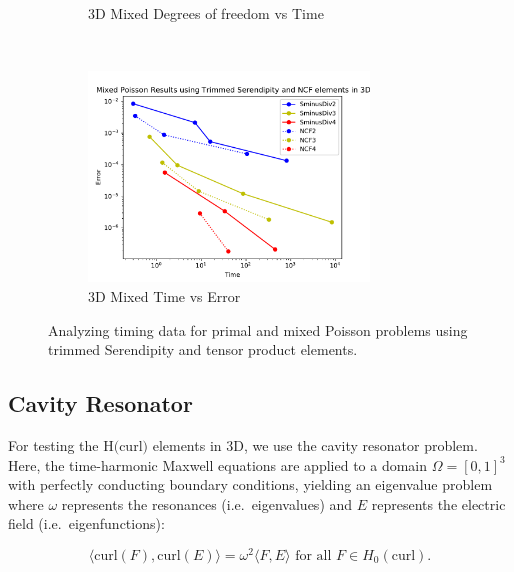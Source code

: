 \documentclass[manuscript,screen]{acmart}
\newcommand{\R}{\mathbb{R}}
\newcommand{\akg}[1]{\textcolor{blue}{\textbf{AG:} #1}}
\begin{document}
\begin{figure}[ht]
\begin{subfigure}[h]{0.5\textwidth}
    \caption{3D Mixed Degrees of freedom vs Time}
    \label{fig:3dMixedDofsTime}
  \end{subfigure}
  ~
  \begin{subfigure}[h]{0.5\textwidth}
    \centering
    \includegraphics[height=2.2in]{3dMixedPoissonTimeError.pdf}
    \caption{3D Mixed Time vs Error}
    \label{fig:3dMixedTimeError}
  \end{subfigure}
  \caption{Analyzing timing data for primal and mixed Poisson problems using trimmed Serendipity and tensor product elements.}
\label{fig:PrimalMixedTimeAnalysis}
\end{figure}


\newpage  
  
\newpage 



\subsection{Cavity Resonator}

For testing the H$($curl$)$ elements in 3D, we use the cavity resonator problem.  Here, the time-harmonic Maxwell equations are applied to a domain $\Omega = [0,1]^3$ with perfectly conducting boundary conditions, yielding an eigenvalue problem where $\omega$ represents the resonances (i.e.\ eigenvalues) and $E$ represents the electric field (i.e.\ eigenfunctions):


\begin{equation}
    \langle \text{curl}(F), \text{curl}(E) \rangle = \omega^2 \langle F, E \rangle \text{ for all } F \in H_0(\text{curl}).
\end{equation}

\end{document}

